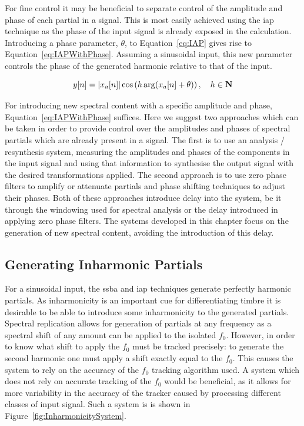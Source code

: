 		For fine control it may be beneficial to separate control of the amplitude and phase of each partial in a
		signal. This is most easily achieved using the \acrshort{iap} technique as the phase of the input signal is
		already exposed in the calculation. Introducing a phase parameter, $\theta$, to Equation~\ref{eq:IAP} gives
		rise to Equation~\ref{eq:IAPWithPhase}. Assuming a sinusoidal input, this new parameter controls the phase
		of the generated harmonic relative to that of the input. 

		\begin{equation}
			y[n] = \left|x_{a}[n]\right| \cos \left( h\arg(x_{a}[n] + \theta) \right), \quad h \in \textbf{N}
			\label{eq:IAPWithPhase}
		\end{equation}

		For introducing new spectral content with a specific amplitude and phase, Equation~\ref{eq:IAPWithPhase}
		suffices. Here we suggest two approaches which can be taken in order to provide control over the amplitudes
		and phases of spectral partials which are already present in a signal. The first is to use an analysis /
		resynthesis system, measuring the amplitudes and phases of the components in the input signal and using
		that information to synthesise the output signal with the desired transformations applied.  The second
		approach is to use zero phase filters to amplify or attenuate partials and phase shifting techniques to
		adjust their phases. Both of these approaches introduce delay into the system, be it through the windowing
		used for spectral analysis or the delay introduced in applying zero phase filters. The systems developed in
		this chapter focus on the generation of new spectral content, avoiding the introduction of this delay.

	\subsection{Generating Inharmonic Partials}
	\label{sec:FeatureControl-Systems-Inharmonicity}
		For a sinusoidal input, the \acrshort{ssba} and \acrshort{iap} techniques generate perfectly harmonic
		partials. As inharmonicity is an important cue for differentiating timbre it is desirable to be able to
		introduce some inharmonicity to the generated partials. Spectral replication allows for generation of
		partials at any frequency as a spectral shift of any amount can be applied to the isolated $f_{0}$.
		However, in order to know what shift to apply the $f_{0}$ must be tracked precisely: to generate the second
		harmonic one must apply a shift exactly equal to the $f_{0}$. This causes the system to rely on the
		accuracy of the $f_{0}$ tracking algorithm used. A system which does not rely on accurate tracking of the
		$f_{0}$ would be beneficial, as it allows for more variability in the accuracy of the tracker caused by
		processing different classes of input signal. Such a system is is shown in
		Figure~\ref{fig:InharmonicitySystem}.

